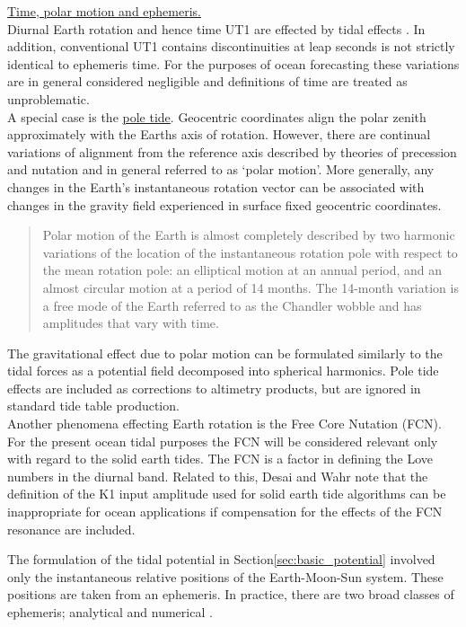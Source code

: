 \underline{Time, polar motion and ephemeris.}\\ 
Diurnal Earth rotation and hence time UT1 are effected by tidal effects \citep[sec 8]{IERS2003}.  In addition, conventional UT1 contains discontinuities at leap seconds is not strictly identical to ephemeris time.  For the purposes of ocean forecasting these variations are in general considered negligible and definitions of time are treated as unproblematic.\\


A special case is the \underline{pole tide}. Geocentric coordinates align the polar zenith approximately with the Earths axis of rotation. However, there are continual variations of alignment from the reference axis described by theories of precession and nutation and in general referred to as `polar motion'.   More generally, any changes in the Earth's instantaneous rotation vector can be associated with changes in the gravity field  experienced in surface fixed geocentric coordinates.\\
\begin{quotation} \noindent
Polar motion of the Earth is almost completely described by two harmonic variations of the location of the instantaneous rotation pole with respect to the mean rotation pole: an elliptical motion at an annual period, and an almost circular motion at a period of 14 months. The 14-month variation is a free mode of the Earth referred to as the Chandler wobble and has amplitudes that vary with time. \citet{Desai:2002ev}
\end{quotation}
The gravitational effect due to polar motion can be formulated similarly to the tidal forces as a potential field decomposed into spherical harmonics.
Pole tide effects are included as corrections to altimetry products, but are ignored in standard tide table production.\\
Another phenomena effecting Earth rotation is the Free Core Nutation (FCN).  For the present ocean tidal purposes the FCN will be considered relevant only with regard to the solid earth tides.  The FCN is a factor in defining the  Love numbers in the diurnal band.   Related to this, Desai and Wahr note that the definition of the K1 input amplitude used for solid earth tide algorithms can be inappropriate for ocean applications if compensation for the effects of the FCN resonance are included\citep{Desai:1995je}.



The formulation of the tidal potential in Section\ref{sec:basic_potential} involved only the instantaneous relative positions of the Earth-Moon-Sun system.   These positions are taken from an ephemeris.  In practice, there are two broad classes of ephemeris; analytical and numerical \citep{Wenzel:1997kn}.


